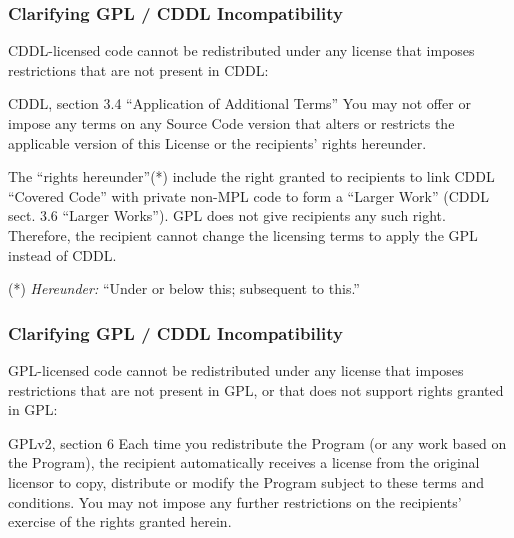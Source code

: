 
\begin{frame}
\frametitle{Clarifying GPL / CDDL Incompatibility}

CDDL-licensed code cannot be redistributed under any license that imposes restrictions that are not present in CDDL:

\begin{block}{CDDL, section 3.4 ``Application of Additional Terms''}
\footnotesize
You may not offer or impose any terms on any Source Code version that alters or restricts the applicable version of this License or the recipients' rights hereunder. 
\end{block}

The ``rights hereunder''(*) include the right granted to recipients to link CDDL ``Covered Code'' with private non-MPL code to form a ``Larger Work'' (CDDL sect. 3.6 ``Larger Works''). GPL does not give recipients any such right. Therefore, the recipient cannot change the licensing terms to apply the GPL instead of CDDL. 

\medskip

\footnotesize{(*) \textit{Hereunder:} ``Under or below this; subsequent to this.''}

\end{frame}



\begin{frame}
\frametitle{Clarifying GPL / CDDL Incompatibility}

GPL-licensed code cannot be redistributed under any license that imposes restrictions that are not present in GPL, or that does not support rights granted in GPL: 

\begin{block}{GPLv2, section 6}
\footnotesize
Each time you redistribute the Program (or any work based on the Program), the recipient automatically receives a license from the original licensor to copy, distribute or modify the Program subject to these terms and conditions. You may not impose any further restrictions on the recipients' exercise of the rights granted herein. 
\end{block}

\end{frame}


